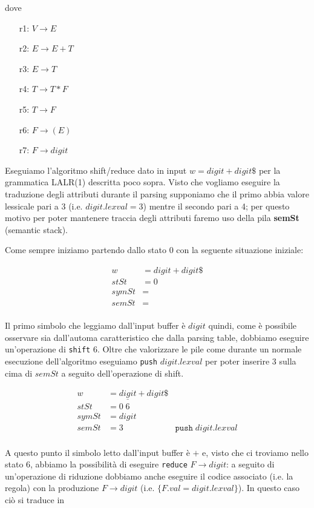 \documentclass[class=book, crop=false, oneside, 12pt]{standalone}
\begin{document}
dove

\begin{itemize}
    \item[r1:] \(V \to E\) 
    \item[r2:] \(E \to E + T\)
    \item[r3:] \(E \to T\)
    \item[r4:] \(T \to T * F\)
    \item[r5:] \(T \to F\)
    \item[r6:] \(F \to (E)\)
    \item[r7:] \(F \to digit\)
\end{itemize}

Eseguiamo l'algoritmo shift/reduce dato in input \(w = digit + digit\$\) per la grammatica LALR(1) descritta poco sopra. Visto che vogliamo eseguire la traduzione degli attributi durante il parsing supponiamo che il primo abbia valore lessicale pari a 3 (i.e. \(digit.lexval = 3\)) mentre il secondo pari a 4; per questo motivo per poter mantenere traccia degli attributi faremo uso della pila \textbf{semSt} (semantic stack). 

Come sempre iniziamo partendo dallo stato 0 con la seguente situazione iniziale:

\begin{align*}
    w &= digit + digit\$ \\
    stSt &= 0 \\
    symSt &= \\     
    semSt &= \\
\end{align*}

Il primo simbolo che leggiamo dall'input buffer è \(digit\) quindi, come è possibile osservare sia dall'automa caratteristico che dalla parsing table, dobbiamo eseguire un'operazione di \texttt{shift} 6. Oltre che valorizzare le pile come durante un normale esecuzione dell'algoritmo eseguiamo \texttt{push} \(digit.lexval\) per poter inserire 3 sulla cima di \(semSt\) a seguito dell'operazione di shift.

\begin{align*}
    w &= \underline{digit} + digit\$ \\
    stSt &= 0\; 6 \\
    symSt &= digit \\     
    semSt &= 3 &\texttt{push}\;digit.lexval \\
\end{align*}

A questo punto il simbolo letto dall'input buffer è \(+\) e, visto che ci troviamo nello stato 6, abbiamo la possibilità di eseguire \texttt{reduce} \(F \to digit\): a seguito di un'operazione di riduzione dobbiamo anche eseguire il codice associato (i.e. la regola) con la produzione \(F \to digit\) (i.e. \(\{F.val = digit.lexval\}\)). In questo caso ciò si traduce in 
\end{document}
